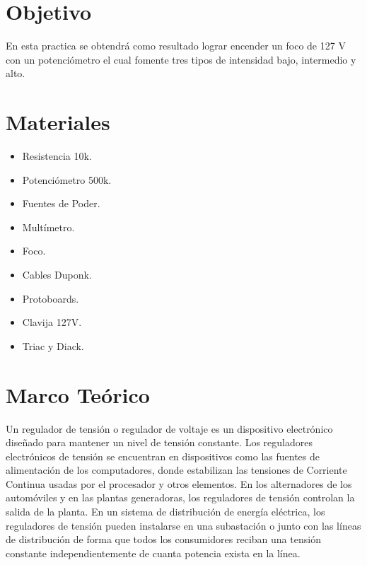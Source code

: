 \documentclass[10pt,a4paper]{article}
\begin{document}
\newpage

\section{Objetivo}
En esta practica se obtendrá como resultado lograr encender un foco de 127 V con un potenciómetro el cual fomente tres tipos de intensidad bajo, intermedio y alto.

\section{Materiales}

\begin{itemize}

\item Resistencia 10k.
\item Potenciómetro 500k.
\item Fuentes de Poder.
\item Multímetro.
\item Foco.
\item Cables Duponk.
\item Protoboards.
\item Clavija 127V.
\item Triac y Diack.

\end{itemize}

\section{Marco Teórico}

Un regulador de tensión o regulador de voltaje es un dispositivo electrónico diseñado para mantener un nivel de tensión constante.
Los reguladores electrónicos de tensión se encuentran en dispositivos como las fuentes de alimentación de los computadores, donde estabilizan las tensiones de Corriente Continua usadas por el procesador y otros elementos. En los alternadores de los automóviles y en las plantas generadoras, los reguladores de tensión controlan la salida de la planta. En un sistema de distribución de energía eléctrica, los reguladores de tensión pueden instalarse en una subastación o junto con las líneas de distribución de forma que todos los consumidores reciban una tensión constante independientemente de cuanta potencia exista en la línea.\\
\end{document}
